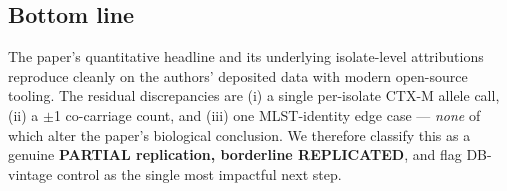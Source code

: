 \documentclass[11pt]{article}
\begin{document}
\subsection*{Bottom line}
The paper's quantitative headline and its underlying isolate-level
attributions reproduce cleanly on the authors' deposited data with modern
open-source tooling. The residual discrepancies are (i) a single per-isolate
CTX-M allele call, (ii) a $\pm$1 co-carriage count, and (iii) one
MLST-identity edge case --- \emph{none} of which alter the paper's biological
conclusion. We therefore classify this as a genuine \textbf{PARTIAL
replication, borderline REPLICATED}, and flag DB-vintage control as the
single most impactful next step.
\end{document}
